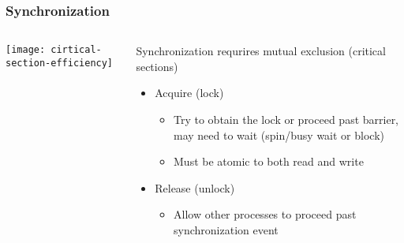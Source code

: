 \begin{frame}[plain]	
	\frametitle{Synchronization}
	
	
	\begin{columns}
		
		\begin{column}{.4\textwidth}
			\texttt{[image: cirtical-section-efficiency]}
		\end{column}
		\begin{column}{.6\textwidth}
			Synchronization requrires mutual exclusion (critical sections)
			
			\begin{itemize}
				\item Acquire (lock)
				\begin{itemize}
					\item Try to obtain the lock or proceed past barrier, may need to wait (spin/busy wait or block)
					\item Must be atomic to both read and write
				\end{itemize}
				\item Release  (unlock)
				\begin{itemize}
					\item Allow other processes to proceed past synchronization event
					
				\end{itemize}				
			\end{itemize}		
			
		\end{column}
	\end{columns}
	
\end{frame}


